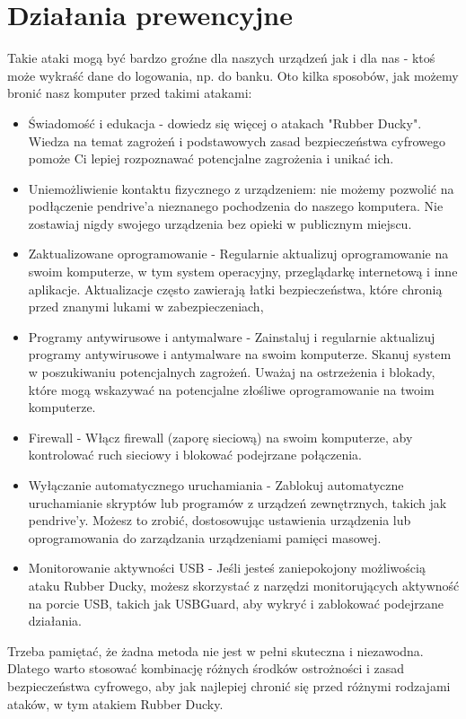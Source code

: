 \documentclass{article}
\begin{document}
\section{Działania prewencyjne}

Takie ataki mogą być bardzo groźne dla naszych urządzeń jak i dla nas - ktoś może wykraść dane do logowania, np. do banku.
Oto kilka sposobów, jak możemy bronić nasz komputer przed takimi atakami:
\begin{itemize}
    \item Świadomość i edukacja - dowiedz się więcej o atakach "Rubber Ducky". Wiedza na temat zagrożeń i podstawowych zasad bezpieczeństwa cyfrowego pomoże Ci lepiej rozpoznawać potencjalne zagrożenia i unikać ich.
    \item Uniemożliwienie kontaktu fizycznego z urządzeniem: nie możemy pozwolić na podłączenie pendrive'a nieznanego pochodzenia do naszego komputera. Nie zostawiaj nigdy swojego urządzenia bez opieki w publicznym miejscu.
    \item Zaktualizowane oprogramowanie - Regularnie aktualizuj oprogramowanie na swoim komputerze, w tym system operacyjny, przeglądarkę internetową i inne aplikacje. Aktualizacje często zawierają łatki bezpieczeństwa, które chronią przed znanymi lukami w zabezpieczeniach,
    \item Programy antywirusowe i antymalware - Zainstaluj i regularnie aktualizuj programy antywirusowe i antymalware na swoim komputerze. Skanuj system w poszukiwaniu potencjalnych zagrożeń. Uważaj na ostrzeżenia i blokady, które mogą wskazywać na potencjalne złośliwe oprogramowanie na twoim komputerze.
    \item Firewall - Włącz firewall (zaporę sieciową) na swoim komputerze, aby kontrolować ruch sieciowy i blokować podejrzane połączenia.
    \item Wyłączanie automatycznego uruchamiania - Zablokuj automatyczne uruchamianie skryptów lub programów z urządzeń zewnętrznych, takich jak pendrive'y. Możesz to zrobić, dostosowując ustawienia urządzenia lub oprogramowania do zarządzania urządzeniami pamięci masowej.
    \item Monitorowanie aktywności USB - Jeśli jesteś zaniepokojony możliwością ataku Rubber Ducky, możesz skorzystać z narzędzi monitorujących aktywność na porcie USB, takich jak USBGuard, aby wykryć i zablokować podejrzane działania.
\end{itemize}

Trzeba pamiętać, że żadna metoda nie jest w pełni skuteczna i niezawodna. Dlatego warto stosować kombinację różnych środków ostrożności i zasad bezpieczeństwa cyfrowego, aby jak najlepiej chronić się przed różnymi rodzajami ataków, w tym atakiem Rubber Ducky.
\end{document}
